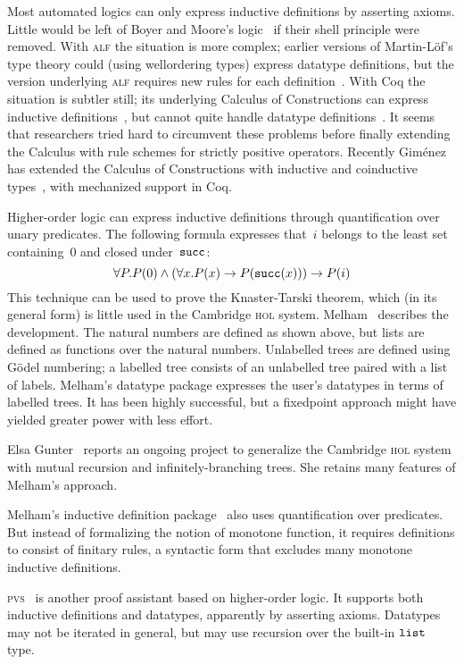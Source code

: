 \documentclass[12pt,a4paper]{article}
\def\succ{\hbox{\tt succ}}
\newcommand\lst{\hbox{\tt list}}
\begin{document}
Most automated logics can only express inductive definitions by asserting
axioms.  Little would be left of Boyer and Moore's logic~\cite{bm79} if their
shell principle were removed.  With \textsc{alf} the situation is more
complex; earlier versions of Martin-L\"of's type theory could (using
wellordering types) express datatype definitions, but the version underlying
\textsc{alf} requires new rules for each definition~\cite{dybjer91}.  With Coq
the situation is subtler still; its underlying Calculus of Constructions can
express inductive definitions~\cite{huet88}, but cannot quite handle datatype
definitions~\cite{paulin-tlca}.  It seems that researchers tried hard to
circumvent these problems before finally extending the Calculus with rule
schemes for strictly positive operators.  Recently Gim{\'e}nez has extended
the Calculus of Constructions with inductive and coinductive
types~\cite{gimenez-codifying}, with mechanized support in Coq.

Higher-order logic can express inductive definitions through quantification
over unary predicates.  The following formula expresses that~$i$ belongs to the
least set containing~0 and closed under~$\succ$:
\[ \forall P. P(0)\conj (\forall x.P(x)\imp P(\succ(x))) \imp P(i) \] 
This technique can be used to prove the Knaster-Tarski theorem, which (in its
general form) is little used in the Cambridge \textsc{hol} system.
Melham~\cite{melham89} describes the development.  The natural numbers are
defined as shown above, but lists are defined as functions over the natural
numbers.  Unlabelled trees are defined using G\"odel numbering; a labelled
tree consists of an unlabelled tree paired with a list of labels.  Melham's
datatype package expresses the user's datatypes in terms of labelled trees.
It has been highly successful, but a fixedpoint approach might have yielded
greater power with less effort.

Elsa Gunter~\cite{gunter-trees} reports an ongoing project to generalize the
Cambridge \textsc{hol} system with mutual recursion and infinitely-branching
trees.  She retains many features of Melham's approach.

Melham's inductive definition package~\cite{camilleri92} also uses
quantification over predicates.  But instead of formalizing the notion of
monotone function, it requires definitions to consist of finitary rules, a
syntactic form that excludes many monotone inductive definitions.

\textsc{pvs}~\cite{pvs-language} is another proof assistant based on
higher-order logic.  It supports both inductive definitions and datatypes,
apparently by asserting axioms.  Datatypes may not be iterated in general, but
may use recursion over the built-in $\lst$ type.
\end{document}
